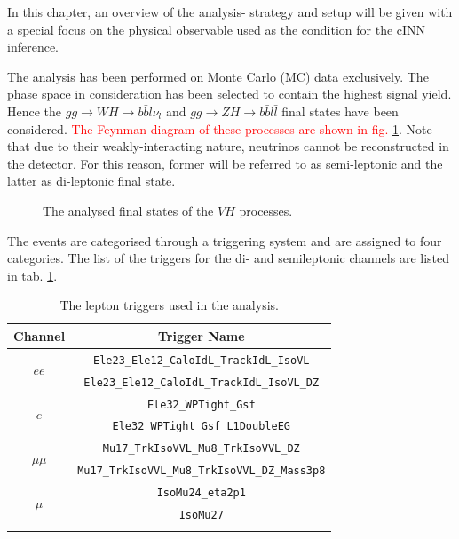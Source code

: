 \label{ch:analysis_strategy}

In this chapter, an overview of the analysis- strategy and setup will be given with a special focus on the physical observable used as the condition for the cINN inference.


The analysis has been performed on Monte Carlo (MC) data exclusively. The phase space in consideration has been selected to contain the highest signal yield. Hence the $gg \rightarrow WH \rightarrow b\bar{b} l\nu_l$ and $gg \rightarrow ZH \rightarrow b\bar{b}l\bar{l}$ final states have been considered. \textcolor{red}{ The Feynman diagram of these processes are shown in fig. \ref{fig:VH_finalstates}}. Note that due to their weakly-interacting nature, neutrinos cannot be reconstructed in the detector. For this reason, former will be referred to as semi-leptonic and the latter as di-leptonic final state.

\begin{figure}[h!]
	\centering
	\caption{The analysed final states of the $VH$ processes.}
	\label{fig:VH_finalstates}
\end{figure}

The events are categorised through a triggering system and are assigned to four categories. The list of the triggers for the di- and semileptonic channels are listed in tab. \ref{tab:triggers}.

\begin{table}[h!]
	\centering
	\begin{tabular}{cc}
		Channel & Trigger Name \\
		\hline 
		\multirow{2}{*}{$ee$} & \texttt{Ele23\_Ele12\_CaloIdL\_TrackIdL\_IsoVL} \\
		& \texttt{Ele23\_Ele12\_CaloIdL\_TrackIdL\_IsoVL\_DZ} \\
		\hline 
		\multirow{2}{*}{$e$} & \texttt{Ele32\_WPTight\_Gsf} \\
		& \texttt{Ele32\_WPTight\_Gsf\_L1DoubleEG} \\
		\hline 
		\multirow{2}{*}{$\mu\mu$} & \texttt{Mu17\_TrkIsoVVL\_Mu8\_TrkIsoVVL\_DZ} \\
		& \texttt{Mu17\_TrkIsoVVL\_Mu8\_TrkIsoVVL\_DZ\_Mass3p8} \\
		\hline 
		\multirow{2}{*}{$\mu$} & \texttt{IsoMu24\_eta2p1} \\
		& \texttt{IsoMu27} \\
		\hline \\
	\end{tabular}
	\caption{The lepton triggers used in the analysis.}
	\label{tab:triggers}
\end{table}


